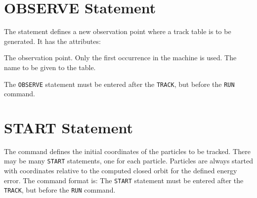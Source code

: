 \section{OBSERVE Statement}
\label{S-OBSERVE}
The statement
defines a new observation point where a track table is to be
generated.
It has the attributes:
\begin{mylist}
The observation point.
Only the first occurrence in the machine is used.
The name to be given to the table.
\end{mylist}
The {\tt OBSERVE} statement must be entered after the {\tt TRACK},
but before the {\tt RUN} command.
 
\section{START Statement}
\label{S-START}
The  command defines the initial coordinates of
the particles to be tracked.
There may be many {\tt START} statements, one for each particle.
Particles are always started with coordinates relative
to the computed closed orbit for the defined energy error.
The command format is:
The {\tt START} statement must be entered after the {\tt TRACK},
but before the {\tt RUN} command.
 
